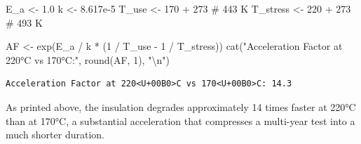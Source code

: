 \documentclass[
  letterpaper,
  DIV=11,
  numbers=noendperiod]{scrreprt}
\newenvironment{Shaded}{\begin{snugshade}}{\end{snugshade}}
\newcommand{\CommentTok}[1]{\textcolor[rgb]{0.37,0.37,0.37}{#1}}
\newcommand{\DecValTok}[1]{\textcolor[rgb]{0.68,0.00,0.00}{#1}}
\newcommand{\FloatTok}[1]{\textcolor[rgb]{0.68,0.00,0.00}{#1}}
\newcommand{\FunctionTok}[1]{\textcolor[rgb]{0.28,0.35,0.67}{#1}}
\newcommand{\NormalTok}[1]{\textcolor[rgb]{0.00,0.23,0.31}{#1}}
\newcommand{\OtherTok}[1]{\textcolor[rgb]{0.00,0.23,0.31}{#1}}
\newcommand{\SpecialCharTok}[1]{\textcolor[rgb]{0.37,0.37,0.37}{#1}}
\newcommand{\StringTok}[1]{\textcolor[rgb]{0.13,0.47,0.30}{#1}}
\begin{document}
\begin{Shaded}
\begin{Highlighting}[]
\NormalTok{E\_a      }\OtherTok{\textless{}{-}} \FloatTok{1.0}
\NormalTok{k        }\OtherTok{\textless{}{-}} \FloatTok{8.617e{-}5}
\NormalTok{T\_use    }\OtherTok{\textless{}{-}} \DecValTok{170} \SpecialCharTok{+} \DecValTok{273}  \CommentTok{\# 443 K}
\NormalTok{T\_stress }\OtherTok{\textless{}{-}} \DecValTok{220} \SpecialCharTok{+} \DecValTok{273}  \CommentTok{\# 493 K}

\NormalTok{AF }\OtherTok{\textless{}{-}} \FunctionTok{exp}\NormalTok{(E\_a }\SpecialCharTok{/}\NormalTok{ k }\SpecialCharTok{*}\NormalTok{ (}\DecValTok{1} \SpecialCharTok{/}\NormalTok{ T\_use }\SpecialCharTok{{-}} \DecValTok{1} \SpecialCharTok{/}\NormalTok{ T\_stress))}
\FunctionTok{cat}\NormalTok{(}\StringTok{"Acceleration Factor at 220°C vs 170°C:"}\NormalTok{, }\FunctionTok{round}\NormalTok{(AF, }\DecValTok{1}\NormalTok{), }\StringTok{"}\SpecialCharTok{\textbackslash{}n}\StringTok{"}\NormalTok{)}
\end{Highlighting}
\end{Shaded}

\begin{verbatim}
Acceleration Factor at 220<U+00B0>C vs 170<U+00B0>C: 14.3 
\end{verbatim}

As printed above, the insulation degrades approximately 14 times faster
at 220°C than at 170°C, a substantial acceleration that compresses a
multi-year test into a much shorter duration.
\end{document}
